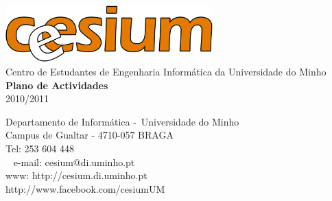 \begin{titlepage}
	\begin{center}
		\vspace*{\fill}
		\includegraphics[width=0.6\textwidth]{files/cesiumLogoSolido}\\
		Centro de Estudantes de Engenharia Informática da Universidade do Minho\\

		\vspace{20pt}
		\Huge\textbf{Plano de Actividades}\\

		\vspace{15pt}
		\huge{2010/2011}
		\vspace*{\fill}
	\end{center}

	\begin{flushright}
		Departamento de Informática - Universidade do Minho\\
        Campus de Gualtar - 4710-057 BRAGA\\
        Tel: 253 604 448\\ 
        e-mail: cesium@di.uminho.pt\\
        www: http://cesium.di.uminho.pt\\
        http://www.facebook.com/cesiumUM
	\end{flushright}
\end{titlepage}

